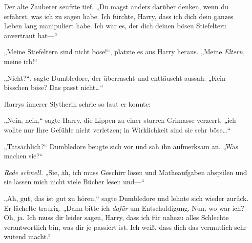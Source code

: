 Der alte Zauberer seufzte tief. „Du magst anders darüber denken, wenn du erfährst, was ich zu sagen habe. Ich fürchte, Harry, dass ich dich dein ganzes Leben lang manipuliert habe. Ich war es, der dich deinen bösen Stiefeltern anvertraut hat—“

„Meine Stiefeltern sind nicht böse!“, platzte es aus Harry heraus. „Meine \emph{Eltern}, meine ich!“

„Nicht?“, sagte Dumbledore, der überrascht und enttäuscht aussah. „Kein bisschen böse? Das passt nicht…“

Harrys innerer Slytherin schrie so laut er konnte: \emph{}

„Nein, nein,“ sagte Harry, die Lippen zu einer starren Grimasse verzerrt, „ich wollte nur Ihre Gefühle nicht verletzen; in Wirklichkeit sind sie sehr böse…“

„Tatsächlich?“ Dumbledore beugte sich vor und sah ihn aufmerksam an. „Was machen sie?“

\emph{Rede schnell.} „Sie, äh, ich muss Geschirr lösen und Matheaufgaben abspülen und sie lassen mich nicht viele Bücher lesen und—“

„Ah, gut, das ist gut zu hören,“ sagte Dumbledore und lehnte sich wieder zurück. Er lächelte traurig. „Dann bitte ich \emph{dafür} um Entschuldigung. Nun, wo war ich? Oh, ja. Ich muss dir leider sagen, Harry, dass ich für nahezu alles Schlechte verantwortlich bin, was dir je passiert ist. Ich weiß, dass dich das vermutlich sehr wütend macht.“

